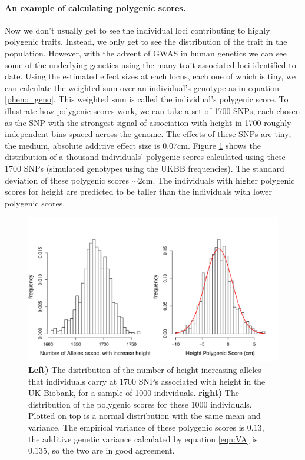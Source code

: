 \paragraph{An example of calculating polygenic scores.}
Now we don't usually get to see the individual loci contributing to highly polygenic traits. Instead, we only get to see the distribution of the trait in the population. However, with the advent of GWAS in human genetics we can see some of the underlying genetics using the many trait-associated loci identified to date. Using the estimated effect sizes at each locus, each one of which is tiny, we can calculate the weighted sum over an individual's genotype as in equation \ref{pheno_geno}. This weighted sum is called the individual's polygenic score. To illustrate how polygenic scores work, we can take a set of 1700 SNPs, each chosen as the SNP with the strongest signal of association with height in 1700 roughly independent bins spaced across the genome. The effects of these SNPs are tiny; the medium, absolute additive effect size is $0.07$cm. Figure \ref{fig:Biobank_height_PGS} shows the distribution of a thousand individuals' polygenic scores calculated using these 1700 SNPs (simulated genotypes using the UKBB frequencies). The standard deviation of these polygenic scores $\sim 2$cm. 
The individuals with higher polygenic scores for height are predicted to be taller than the individuals with lower polygenic scores. 
\begin{figure}
\begin{center}
\includegraphics[width=\textwidth]{figures/Biobank_height_dist.pdf}
\end{center}
\caption{{\bf Left)} The distribution of the number of height-increasing alleles that individuals carry at 1700 SNPs associated with height in the UK Biobank, for a sample of 1000 individuals. {\bf right)} The distribution of the polygenic scores for these 1000 individuals. Plotted on top is a normal distribution with the same mean and variance. The empirical variance of these polygenic scores is $0.13$, the additive genetic variance calculated by equation \eqref{eqn:VA} is $0.135$, so the two are in good agreement. } \label{fig:Biobank_height_PGS}
\end{figure}
 

